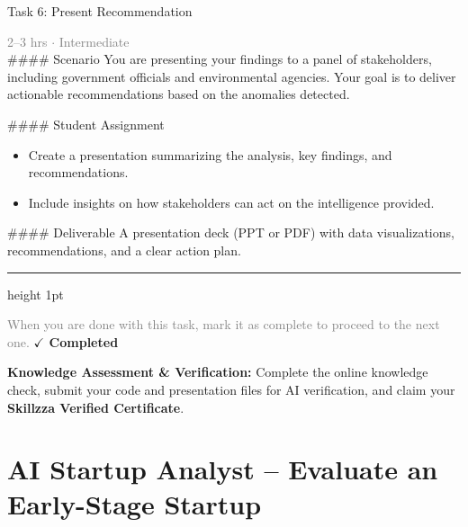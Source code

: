 \documentclass[10pt,a4paper]{article}
\begin{document}
\begin{taskbox}{Task 6: Present Recommendation}

    {\small \textcolor{gray}{2--3 hrs $\cdot$ Intermediate}}\\[12pt]

    \#\#\#\# Scenario  
You are presenting your findings to a panel of stakeholders, including government officials and environmental agencies. Your goal is to deliver actionable recommendations based on the anomalies detected.  

\#\#\#\# Student Assignment  
\begin{itemize}
    \item Create a presentation summarizing the analysis, key findings, and recommendations.  
    \item Include insights on how stakeholders can act on the intelligence provided.  
\end{itemize}

\#\#\#\# Deliverable  
A presentation deck (PPT or PDF) with data visualizations, recommendations, and a clear action plan.\par

    \vspace{16pt}

    \textcolor{cardBorder}{\hrule height 1pt}\vspace{8pt}

    \small \textcolor{gray}{When you are done with this task, mark it as complete to proceed to the next one.} \hfill \textbf{\textcolor{brandDark}{$\checkmark$ Completed}}

\end{taskbox}

\begin{completionbox}
    \textbf{Knowledge Assessment \& Verification:} Complete the online knowledge check, submit your code and presentation files for AI verification, and claim your \textbf{Skillzza Verified Certificate}.
\end{completionbox}

\newpage




\section*{AI Startup Analyst – Evaluate an Early-Stage Startup}
\end{document}
